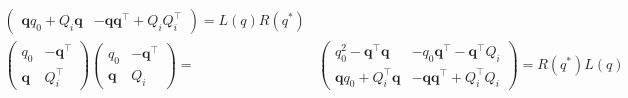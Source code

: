 \documentclass[
]{book}
\theoremstyle{definition}
\theoremstyle{definition}
\theoremstyle{definition}
\theoremstyle{definition}
\theoremstyle{remark}
\begin{document}
\[\begin{aligned}
\begin{pmatrix}
\boldsymbol{q}q_{{\scriptscriptstyle 0}}+Q_{{\scriptscriptstyle i}}\boldsymbol{q} & -\boldsymbol{q}\boldsymbol{q}^{\intercal}+Q_{{\scriptscriptstyle i}}Q_{{\scriptscriptstyle i}}^{\intercal}
\end{pmatrix}=L\left(q\right)R\left(q^{*}\right)\\
\begin{pmatrix}q_{{\scriptscriptstyle 0}} & -\boldsymbol{q}^{\intercal}\\
\boldsymbol{q} & Q_{{\scriptscriptstyle i}}^{\intercal}
\end{pmatrix}\begin{pmatrix}q_{{\scriptscriptstyle 0}} & -\boldsymbol{q}^{\intercal}\\
\boldsymbol{q} & Q_{{\scriptscriptstyle i}}
\end{pmatrix}= & \begin{pmatrix}q_{{\scriptscriptstyle 0}}^{2}-\boldsymbol{q}^{\intercal}\boldsymbol{q} & -q_{{\scriptscriptstyle 0}}\boldsymbol{q}^{\intercal}-\boldsymbol{q}^{\intercal}Q_{{\scriptscriptstyle i}}\\
\boldsymbol{q}q_{{\scriptscriptstyle 0}}+Q_{{\scriptscriptstyle i}}^{\intercal}\boldsymbol{q} & -\boldsymbol{q}\boldsymbol{q}^{\intercal}+Q_{{\scriptscriptstyle i}}^{\intercal}Q_{{\scriptscriptstyle i}}
\end{pmatrix}=R\left(q^{*}\right)L\left(q\right)
\end{aligned}
\]
\end{document}
